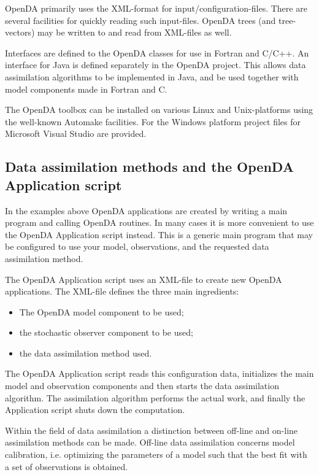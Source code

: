 OpenDA primarily uses the XML-format for input/configuration-files. There are several facilities for quickly reading such input-files. OpenDA trees (and tree-vectors) may be written to and read from XML-files as well.

Interfaces are defined to the OpenDA classes for use in Fortran and C/C++. An interface for Java is defined separately in the OpenDA project. This allows data assimilation algorithms to be implemented in Java, and be used together with model components made in Fortran and C.

The OpenDA toolbox can be installed on various Linux and Unix-platforms using the well-known Automake facilities. For the Windows platform project files for Microsoft Visual Studio are provided.

\subsection{Data assimilation methods and the OpenDA Application script}

In the examples above OpenDA applications are created by writing a main program and calling OpenDA routines. In many cases it is more convenient to use the OpenDA Application script instead. This is a generic main program that may be configured to use your model, observations, and the requested data assimilation method.

The OpenDA Application script uses an XML-file to create new OpenDA applications. The XML-file defines the three main ingredients:

\begin{itemize}
	\item The OpenDA model component to be used;
	\item the stochastic observer component to be used;
	\item the data assimilation method used.
\end{itemize}

The OpenDA Application script reads this configuration data, initializes the main model and observation components and then starts the data assimilation algorithm. The assimilation algorithm performs the actual work, and finally the Application script shuts down the computation.

Within the field of data assimilation a distinction between off-line and on-line assimilation methods can be made. Off-line data assimilation concerns model calibration, i.e. optimizing the parameters of a model such that the best fit with a set of observations is obtained.

